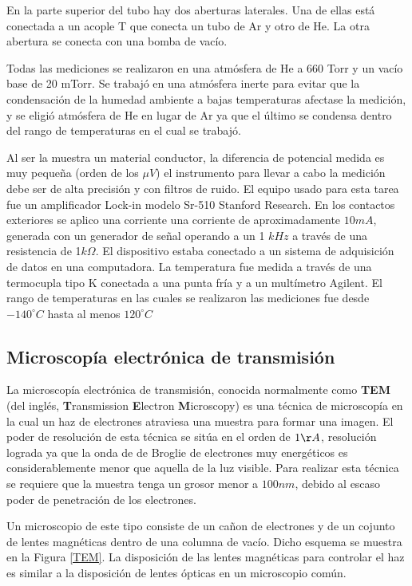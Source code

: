\documentclass{article}
\theoremstyle{definition}
\theoremstyle{remark}
\begin{document}
En la parte superior del tubo hay dos aberturas laterales. Una de ellas está conectada a un acople T que conecta un tubo de Ar y otro de He. La otra abertura se conecta con una bomba de vacío.

Todas las mediciones se realizaron en una atmósfera de He a 660 Torr y un vacío base de 20 mTorr. Se trabajó en una atmósfera inerte para evitar que la condensación de la humedad ambiente a bajas temperaturas afectase la medición, y se eligió atmósfera de He en lugar de Ar ya que el último se condensa dentro del rango de temperaturas en el cual se trabajó.

Al ser la muestra un material conductor, la diferencia de potencial medida es muy pequeña (orden de los $\mu V$) el instrumento para llevar a cabo la medición debe ser de alta precisión y con filtros de ruido. El equipo usado para esta tarea fue un amplificador Lock-in modelo Sr-510 Stanford Research. En los contactos exteriores se aplico una corriente una corriente de aproximadamente $10mA$, generada con un generador de señal operando a un 1 $kHz$ a través de una resistencia de 1$k\Omega$. El dispositivo estaba conectado a un sistema de adquisición de datos en una computadora. La temperatura fue medida a través de una termocupla tipo K conectada a una punta fría y a un multímetro Agilent. El rango de temperaturas en las cuales se realizaron las mediciones fue desde $-140 ^\circ C$ hasta al menos $120 ^\circ C$


\subsection{Microscopía electrónica de transmisión}
La microscopía electrónica de transmisión, conocida normalmente como \textbf{TEM} (del inglés, \textbf{T}ransmission \textbf{E}lectron \textbf{M}icroscopy) es una técnica de microscopía en la cual un haz de electrones atraviesa una muestra para formar una imagen. El poder de resolución de esta técnica se sitúa en el orden de $1 \AA$, resolución lograda ya que la onda de de Broglie de electrones muy energéticos es considerablemente menor que aquella de la luz visible. Para realizar esta técnica se requiere que la muestra tenga un grosor menor a $100 nm$, debido al escaso poder de penetración de los electrones.

Un microscopio de este tipo consiste de un cañon de electrones y de un cojunto de lentes magnéticas dentro de una columna de vacío. Dicho esquema se muestra en la Figura \ref{TEM}. La disposición de las lentes magnéticas para controlar el haz es similar a la disposición de lentes ópticas en un microscopio común.
\end{document}

